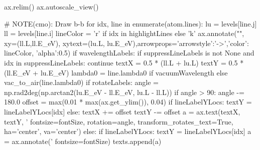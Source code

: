 \begin{pycode}[FlareObs]
    ax.relim()
    ax.autoscale_view()


    # NOTE(cmo): Draw b-b
    for idx, line in enumerate(atom.lines):
        lu = levels[line.j]
        ll = levels[line.i]
        lineColor = 'r' if idx in highlightLines else 'k'
        ax.annotate("", xy=(ll.L,ll.E_eV), xytext=(lu.L, lu.E_eV),arrowprops={'arrowstyle':'->','color': lineColor, 'alpha':0.5})
        if wavelengthLabels:
            if suppressLineLabels is not None and idx in suppressLineLabels:
                continue
            textX = 0.5 * (ll.L + lu.L)
            textY = 0.5 * (ll.E_eV + lu.E_eV)
            lambda0 = line.lambda0 if vacuumWavelength else vac_to_air(line.lambda0)
            if rotateLabels:
                angle = np.rad2deg(np.arctan2(lu.E_eV - ll.E_eV, lu.L - ll.L))
                if angle > 90:
                    angle -= 180.0
                offset = max(0.01 * max(ax.get_ylim()), 0.04)
                if lineLabelYLocs:
                    textY = lineLabelYLocs[idx]
                else:
                    textX += offset
                    textY -= offset
                a = ax.text(textX, textY, '%
                                fontsize=fontSize, rotation=angle, transform_rotates_text=True, ha='center', va='center')
            else:
                if lineLabelYLocs:
                    textY = lineLabelYLocs[idx]
                a = ax.annotate('%
                                fontsize=fontSize)
            texts.append(a)


\end{pycode}
